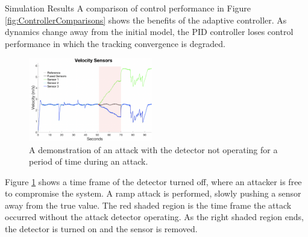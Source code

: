 \begin{section}{Simulation Results}
A comparison of control performance in Figure \ref{fig:ControllerComparisons} shows the benefits of the adaptive controller. As dynamics change away from the initial model, the PID controller loses control performance in which the tracking convergence is degraded.




\begin{figure}
\vspace{1pt}
\includegraphics[width = 0.48\textwidth]{Figures/NoDetection_Vel.png}
\caption{A demonstration of an attack with the detector not operating for a period of time during an attack. }
\label{fig:NoDet_Vel}
\end{figure}

Figure \ref{fig:NoDet_Vel} shows a time frame of the detector turned off, where an attacker is free to compromise the system. A ramp attack is performed, slowly pushing a sensor away from the true value. The red shaded region is the time frame the attack occurred without the attack detector operating. As the right shaded region ends, the detector is turned on and the sensor is removed.


\begin{figure}
\begin{tabular}{cc}


\end{tabular}
\end{figure}
\end{section}
